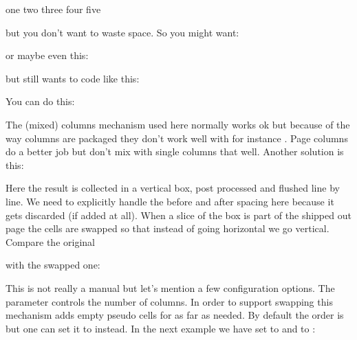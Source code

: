 \startbuffer
\starttabulate[|l|l|]
 \NC one   \NC \NR
{} \NC two   \NC \NR
{} \NC three \NC \NR
{} \NC four  \NC \NR
{} \NC five  \NC \NR
\stoptabulate
\stopbuffer

\typebuffer

but you don't want to waste space. So you might want:

\startrows[n=2,before=\blank,after=\blank]
\getbuffer
\stoprows

or maybe even this:

\startrows[n=3,before=\blank,after=\blank]
\getbuffer
\stoprows

but still wants to code like this:

\typebuffer

You can do this:

\starttyping
\startcolumns[n=3]
\getbuffer
\stopcolumns
\stoptyping

The (mixed) columns mechanism used here normally works ok but because of the way
columns are packaged they don't work well with for instance . Page
columns do a better job but don't mix with single columns that well. Another
solution is this:

\starttyping
\startrows[n=3,before=\blank,after=\blank]
\getbuffer
\stoprows
\stoptyping

Here the result is collected in a vertical box, post processed and flushed line
by line. We need to explicitly handle the before and after spacing here because
it gets discarded (if added at all). When a slice of the box is part of the
shipped out page the cells are swapped so that instead of going horizontal we go
vertical. Compare the original

\start{}
\startrows[n=3,before=\blank,after=\blank,order=horizontal]
\getbuffer
\stoprows
\stop

with the swapped one:

\start{}
\startrows[n=3,before=\blank,after=\blank,order=vertical]
\getbuffer
\stoprows
\stop

This is not really a manual but let's mention a few configuration options. The
 parameter controls the number of columns. In order to support swapping
this mechanism adds empty pseudo cells for as far as needed. By default the \type
{order} is  but one can set it to  instead. In the
next example we have set  to \type {2\strutht} and  to
\type {2\strutdp}:

\start{}
\startrows[n=3,before=\blank,after=\blank,height=2\strutht,depth=2\strutdp]
\getbuffer
\stoprows
\stop

